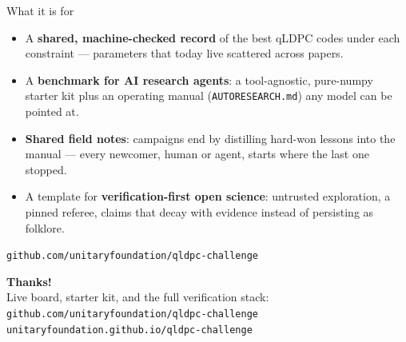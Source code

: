 \documentclass[11pt,aspectratio=169]{beamer}
\newcommand{\code}[1]{\texttt{\small #1}}
\begin{document}
\begin{frame}{What it is for}
  \begin{itemize}\setlength{\itemsep}{9pt}
    \item A \textbf{shared, machine-checked record} of the best qLDPC codes
          under each constraint --- parameters that today live scattered
          across papers.
    \item A \textbf{benchmark for AI research agents}: a tool-agnostic,
          pure-numpy starter kit plus an operating manual
          (\code{AUTORESEARCH.md}) any model can be pointed at.
    \item \textbf{Shared field notes}: campaigns end by distilling hard-won
          lessons into the manual --- every newcomer, human or agent, starts
          where the last one stopped.
    \item A template for \textbf{verification-first open science}: untrusted
          exploration, a pinned referee, claims that decay with evidence
          instead of persisting as folklore.
  \end{itemize}
  \vspace{6pt}
  \begin{center}
    \quad
    \texttt{github.com/unitaryfoundation/qldpc-challenge}
  \end{center}
\end{frame}

\begin{frame}[plain]
  \vfill
  \centering
  {\LARGE\bfseries Thanks!}\\[14pt]
  {\color{muted}Live board, starter kit, and the full verification stack:}\\[6pt]
  \texttt{github.com/unitaryfoundation/qldpc-challenge}\\[2pt]
  {\color{muted}\texttt{unitaryfoundation.github.io/qldpc-challenge}}
  \vfill
\end{frame}
\end{document}
